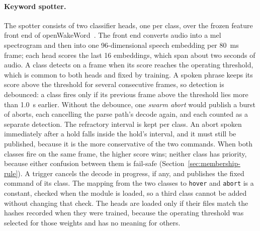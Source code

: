 \paragraph{Keyword spotter.} The spotter consists of two classifier heads, one per class, over the
frozen feature front end of openWakeWord~\cite{oww}. The front end converts audio into a
mel spectrogram and then into one 96-dimensional speech embedding per 80~ms frame; each head scores
the last 16 embeddings, which span about two seconds of audio. A class detects on a frame when its
score reaches the operating threshold, which is common to both heads and fixed by training. A
spoken phrase keeps its score above the threshold for several consecutive frames, so detection is
debounced: a class fires only if its previous frame above the threshold lies more than 1.0~s
earlier. Without the debounce, one \emph{swarm abort} would publish a burst of aborts, each
cancelling the parse path's decode again, and each counted as a separate detection. The refractory
interval is kept per class. An abort spoken immediately after a hold falls inside the hold's
interval, and it must still be published, because it is the more conservative of the two commands.
When both classes fire on the same frame, the higher score wins; neither class has priority,
because either confusion between them is fail-safe (Section~\ref{sec:membership-rule}). A trigger
cancels the decode in progress, if any, and publishes the fixed command of its class. The mapping
from the two classes to \texttt{hover} and \texttt{abort} is a constant, checked when the module is
loaded, so a third class cannot be added without changing that check. The heads are loaded only
if their files match the hashes recorded when they were trained, because the operating threshold
was selected for those weights and has no meaning for others.

